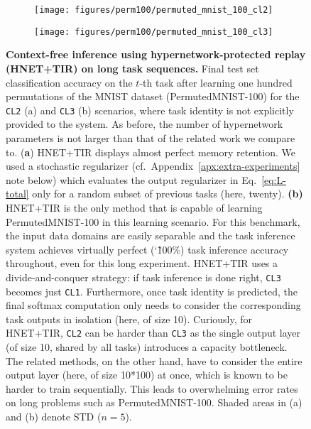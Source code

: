 \documentclass{article}
\begin{document}
\clearpage
\newpage
\clearpage

\begin{figure}
    \centering
    \begin{subfigure}{0.49\linewidth}
    \caption{}
    \texttt{[image: figures/perm100/permuted\_mnist\_100\_cl2]}
    \end{subfigure}
    \begin{subfigure}{0.49\linewidth}
    \caption{}
    \texttt{[image: figures/perm100/permuted\_mnist\_100\_cl3]}
    \end{subfigure}
    \caption{\textbf{Context-free inference using hypernetwork-protected replay (HNET+TIR) on long task sequences.}
    Final test set classification accuracy on the $t$-th task after learning one hundred permutations of the MNIST dataset (PermutedMNIST-100) for the \texttt{CL2} (a) and \texttt{CL3} (b) scenarios, where task identity is not explicitly provided to the system. As before, the number of hypernetwork parameters is not larger than that of the related work we compare to. (\textbf{a}) HNET+TIR displays almost perfect memory retention. We used a stochastic regularizer (cf.~Appendix~\ref{apx:extra-experiments} note below) which evaluates the output regularizer in Eq.~\ref{eq:L-total} only for a random subset of previous tasks (here, twenty). \textbf{(b)} 
    HNET+TIR is the only method that is capable of learning PermutedMNIST-100 in this learning scenario. For this benchmark, the input data domains are easily separable and the task inference system achieves virtually perfect (\char`\~ 100\%) task inference accuracy throughout, even for this long experiment. HNET+TIR uses a divide-and-conquer strategy: if task inference is done right, \texttt{CL3} becomes just \texttt{CL1}. Furthermore, once task identity is predicted, the final softmax computation only needs to consider the corresponding task outputs in isolation (here, of size 10). Curiously, for HNET+TIR, \texttt{CL2} can be harder than \texttt{CL3} as the single output layer (of size 10, shared by all tasks) introduces a capacity bottleneck. The related methods, on the other hand, have to consider the entire output layer (here, of size 10*100) at once, which is known to be harder to train sequentially. This leads to overwhelming error rates on long problems such as PermutedMNIST-100.
    Shaded areas in (a) and (b) denote STD ($n=5$).\label{fig:sm:permutedMNIST100_CL23}}
\end{figure}

\clearpage
\newpage
\end{document}
